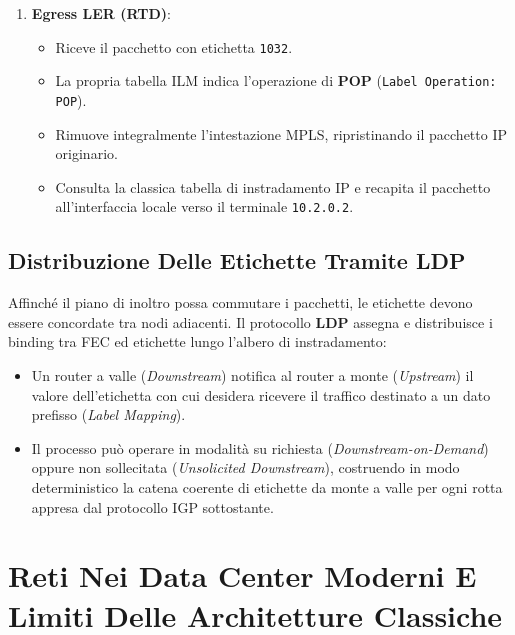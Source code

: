 \documentclass[11pt, a4paper]{article}
\begin{document}
\begin{enumerate}
    \item \textbf{Egress LER (RTD)}:
    \begin{itemize}[noitemsep]
        \item Riceve il pacchetto con etichetta \texttt{1032}.
        \item La propria tabella ILM indica l'operazione di \textbf{POP} (\texttt{Label Operation: POP}).
        \item Rimuove integralmente l'intestazione MPLS, ripristinando il pacchetto IP originario.
        \item Consulta la classica tabella di instradamento IP e recapita il pacchetto all'interfaccia locale verso il terminale \texttt{10.2.0.2}.
    \end{itemize}
\end{enumerate}

\subsection{Distribuzione Delle Etichette Tramite LDP}
Affinché il piano di inoltro possa commutare i pacchetti, le etichette devono essere concordate tra nodi adiacenti. Il protocollo \textbf{LDP} assegna e distribuisce i binding tra FEC ed etichette lungo l'albero di instradamento:
\begin{itemize}[noitemsep]
    \item Un router a valle (\emph{Downstream}) notifica al router a monte (\emph{Upstream}) il valore dell'etichetta con cui desidera ricevere il traffico destinato a un dato prefisso (\emph{Label Mapping}).
    \item Il processo può operare in modalità su richiesta (\emph{Downstream-on-Demand}) oppure non sollecitata (\emph{Unsolicited Downstream}), costruendo in modo deterministico la catena coerente di etichette da monte a valle per ogni rotta appresa dal protocollo IGP sottostante.
\end{itemize}


\newpage

\section{Reti Nei Data Center Moderni E Limiti Delle Architetture Classiche}
\end{document}
